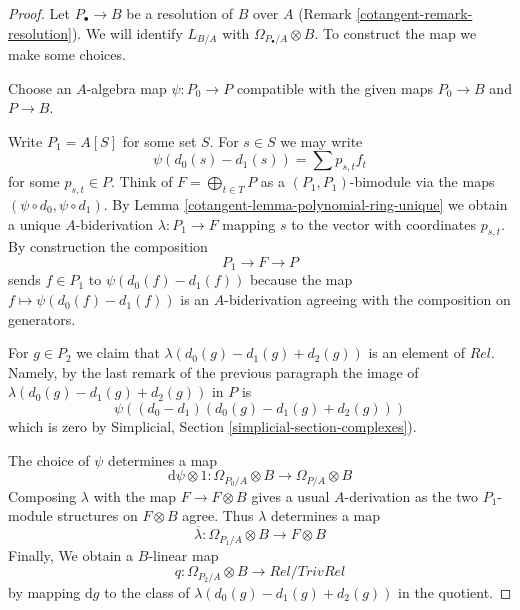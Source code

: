 \begin{proof}

Let $P_\bullet \to B$ be a resolution of $B$ over $A$
(Remark \ref{cotangent-remark-resolution}). We will identify $L_{B/A}$ with
$\Omega_{P_\bullet/A} \otimes B$. To construct the map we
make some choices.

\medskip\noindent
Choose an $A$-algebra map $\psi : P_0 \to P$ compatible with the
given maps $P_0 \to B$ and $P \to B$.

\medskip\noindent
Write $P_1 = A[S]$ for some set $S$. For $s \in S$ we may write
$$
\psi(d_0(s) - d_1(s)) = \sum p_{s, t} f_t
$$
for some $p_{s, t} \in P$. Think of $F = \bigoplus_{t \in T} P$
as a $(P_1, P_1)$-bimodule via the maps $(\psi \circ d_0, \psi \circ d_1)$.
By Lemma \ref{cotangent-lemma-polynomial-ring-unique} we obtain a unique
$A$-biderivation $\lambda : P_1 \to F$ mapping $s$ to the vector with
coordinates $p_{s, t}$. By construction the composition
$$
P_1 \longrightarrow F \longrightarrow P
$$
sends $f \in P_1$ to $\psi(d_0(f) - d_1(f))$ because the map
$f \mapsto \psi(d_0(f) - d_1(f))$ is an $A$-biderivation agreeing with
the composition on generators.

\medskip\noindent
For $g \in P_2$ we claim that $\lambda(d_0(g) - d_1(g) + d_2(g))$
is an element of $Rel$. Namely, by the last remark of the previous
paragraph the image of $\lambda(d_0(g) - d_1(g) + d_2(g))$ in $P$ is
$$
\psi((d_0 - d_1)(d_0(g) - d_1(g) + d_2(g)))
$$
which is zero by Simplicial, Section \ref{simplicial-section-complexes}).

\medskip\noindent
The choice of $\psi$ determines a map
$$
\text{d}\psi \otimes 1 :
\Omega_{P_0/A} \otimes B
\longrightarrow
\Omega_{P/A} \otimes B
$$
Composing $\lambda$ with the map $F \to F \otimes B$ gives a
usual $A$-derivation as the two $P_1$-module structures on
$F \otimes B$ agree. Thus $\lambda$ determines a map
$$
\overline{\lambda} :
\Omega_{P_1/A} \otimes B
\longrightarrow
F \otimes B
$$
Finally, We obtain a $B$-linear map
$$
q :
\Omega_{P_2/A} \otimes B
\longrightarrow
Rel/TrivRel
$$
by mapping $\text{d}g$ to the class of $\lambda(d_0(g) - d_1(g) + d_2(g))$
in the quotient.


\end{proof}
